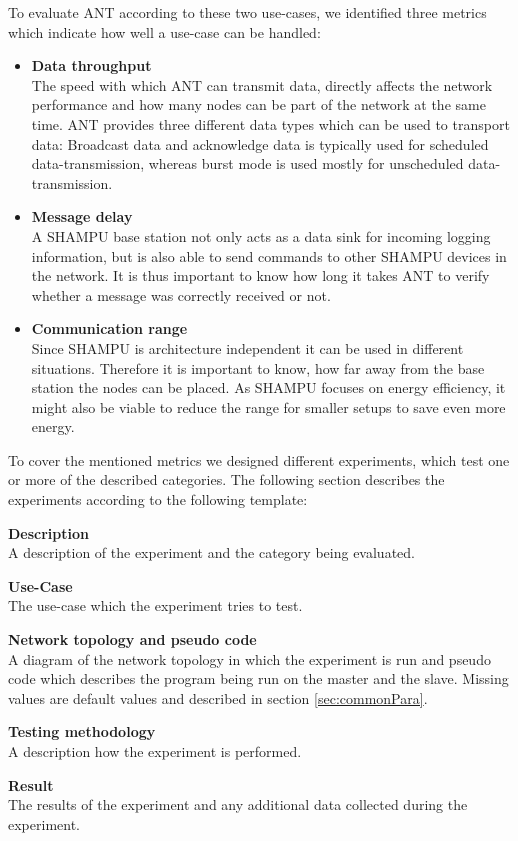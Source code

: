 To evaluate ANT according to these two use-cases, we identified three metrics which indicate how well a use-case can be handled:
	\begin{itemize}
		\item {\textbf{Data throughput }} \hfill \\ The speed with which ANT can transmit data, directly affects the network performance and how many nodes can be part of the network at the same time. ANT provides three different data types which can be used to transport data: Broadcast data and acknowledge data is typically used for scheduled data-transmission, whereas burst mode is used mostly for unscheduled data-transmission. 		
		
		\item {\textbf{Message delay}} \hfill \\ A SHAMPU base station not only acts as a data sink for incoming logging information, but is also able to send commands to other SHAMPU devices in the network.
		It is thus important to know how long it takes ANT to verify whether a message was correctly received or not.
		
		\item {\textbf{Communication range}} \hfill \\ Since SHAMPU is architecture independent it can be used in different situations. Therefore it is important to know, how far away from the base station the nodes can be placed. As SHAMPU focuses on energy efficiency, it might also be viable to reduce the range for smaller setups to save even more energy.
	\end{itemize}

To cover the mentioned metrics we designed different experiments, which test one or more of the described categories. The following section describes the experiments according to the following template:

\begin{description}
	\item{\textbf{Description}} \hfill \\ A description of the experiment and the category being evaluated.
	\item{\textbf{Use-Case}} \hfill \\ The use-case which the experiment tries to test.
	\item{\textbf{Network topology and pseudo code}} \hfill \\ A diagram of the network topology in which the experiment is run and pseudo code which describes the program being run on the master and the slave. Missing values are default values and described in section \ref{sec:commonPara}.
	\item{\textbf{Testing methodology}} \hfill \\ A description how the experiment is performed.
	\item{\textbf{Result}} \hfill \\ The results of the experiment and any additional data collected during the experiment.
\end{description}

